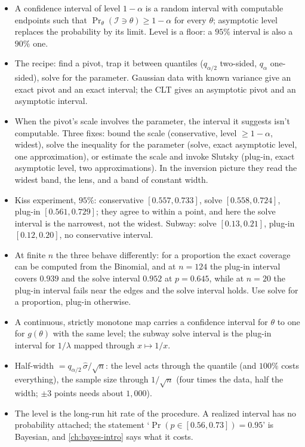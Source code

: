 \begin{itemize}[nosep]
\item A confidence interval of level $1 - \alpha$ is a random interval with computable endpoints such that $\Pr_\theta(\mathcal{I} \ni \theta) \geq 1 - \alpha$ for every $\theta$; asymptotic level replaces the probability by its limit. Level is a floor: a $95\%$ interval is also a $90\%$ one.
\item The recipe: find a pivot, trap it between quantiles ($q_{\alpha/2}$ two-sided, $q_\alpha$ one-sided), solve for the parameter. Gaussian data with known variance give an exact pivot and an exact interval; the CLT gives an asymptotic pivot and an asymptotic interval.
\item When the pivot's scale involves the parameter, the interval it suggests isn't computable. Three fixes: bound the scale (conservative, level $\geq 1 - \alpha$, widest), solve the inequality for the parameter (solve, exact asymptotic level, one approximation), or estimate the scale and invoke Slutsky (plug-in, exact asymptotic level, two approximations). In the inversion picture they read the widest band, the lens, and a band of constant width.
\item Kiss experiment, $95\%$: conservative $[0.557, 0.733]$, solve $[0.558, 0.724]$, plug-in $[0.561, 0.729]$; they agree to within a point, and here the solve interval is the narrowest, not the widest. Subway: solve $[0.13, 0.21]$, plug-in $[0.12, 0.20]$, no conservative interval.
\item At finite $n$ the three behave differently: for a proportion the exact coverage can be computed from the Binomial, and at $n = 124$ the plug-in interval covers $0.939$ and the solve interval $0.952$ at $p = 0.645$, while at $n = 20$ the plug-in interval fails near the edges and the solve interval holds. Use solve for a proportion, plug-in otherwise.
\item A continuous, strictly monotone map carries a confidence interval for $\theta$ to one for $g(\theta)$ with the same level; the subway solve interval is the plug-in interval for $1/\lambda$ mapped through $x \mapsto 1/x$.
\item Half-width $= q_{\alpha/2} \, \widehat{\sigma}/\sqrt{n}$: the level acts through the quantile (and $100\%$ costs everything), the sample size through $1/\sqrt{n}$ (four times the data, half the width; $\pm 3$ points needs about $1{,}000$).
\item The level is the long-run hit rate of the procedure. A realized interval has no probability attached; the statement `$\Pr(p \in [0.56, 0.73]) = 0.95$' is Bayesian, and \cref{ch:bayes-intro} says what it costs.
\end{itemize}

